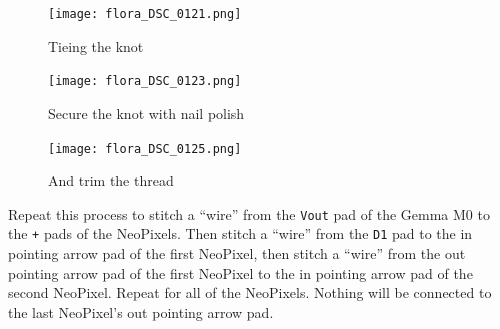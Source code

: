\documentclass[letterpaper,twoside,12pt]{article}
\begin{document}
\begin{figure}[hbpt]\begin{centering}%
\texttt{[image: flora\_DSC\_0121.png]}
\caption{Tieing the knot}
\label{fig:flora_DSC_0121}
\end{centering}\end{figure}
\begin{figure}[hbpt]\begin{centering}%
\texttt{[image: flora\_DSC\_0123.png]}
\caption{Secure the knot with nail polish}
\label{fig:flora_DSC_0123}
\end{centering}\end{figure}
\begin{figure}[hbpt]\begin{centering}%
\texttt{[image: flora\_DSC\_0125.png]}
\caption{And trim the thread}
\label{fig:flora_DSC_0125}
\end{centering}\end{figure}
\clearpage
Repeat this process to stitch a ``wire'' from the \texttt{Vout} pad of the
Gemma M0 to the \texttt{+} pads of the NeoPixels. Then stitch a ``wire'' from
the \texttt{D1} pad to the in pointing arrow pad of the first NeoPixel, then
stitch a ``wire'' from the out pointing arrow pad of the first NeoPixel to the 
in pointing arrow pad of the second NeoPixel. Repeat for all of the NeoPixels. 
Nothing will be connected to the last NeoPixel's out pointing arrow pad.
\end{document}

